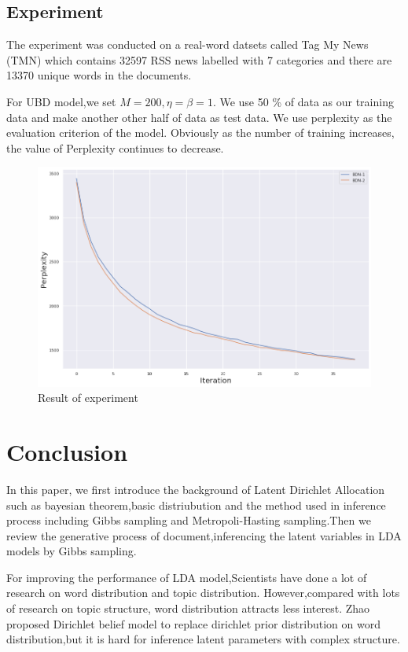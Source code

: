 \section {Experiment}

The experiment was conducted on a real-word datsets called Tag My News (TMN) \cite{data} which contains 32597 RSS news labelled with 7 categories and there are 13370 unique words in the documents.

For UBD model,we set $M = 200,\eta = \beta = 1$. We use 50 \% of data as our training data and make another other half of data as test data. We use perplexity as the evaluation criterion of the model. Obviously as the number of training increases, the value of Perplexity continues to decrease.

\begin{figure}[b]
\includegraphics[width = \linewidth]{res.png}
\caption{Result of experiment}
\label{fig:DirBN Model}
\end{figure}


\chapter{Conclusion}\label{ccl}
In this paper, we first introduce the background of Latent Dirichlet Allocation such as bayesian theorem,basic distriubution and the method used in inference process including Gibbs sampling and Metropoli-Hasting sampling.Then we review the generative process of document,inferencing the latent variables in LDA models by Gibbs sampling.

For improving the performance of LDA model,Scientists have done a lot of research on word distribution and topic distribution. However,compared with lots of research on topic structure, word distribution attracts less interest. Zhao\cite{Zhao} proposed Dirichlet belief model to replace dirichlet prior distribution on word distribution,but it is hard for inference latent parameters with complex structure.


